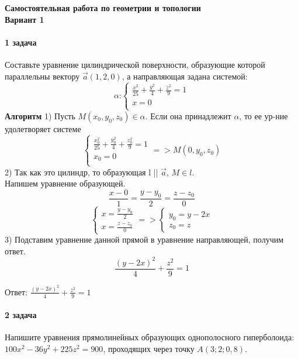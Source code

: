 \documentclass[a4paper,14pt]{extreport} %
\begin{document}
  
\begin{center}
    \textbf{Самостоятельная работа по геометрии и топологии} \\
    \textbf{Вариант 1}
\end{center}

\noindent


\paragraph {1 задача}
 Составьте уравнение цилиндрической поверхности, образующие которой параллельны вектору $\vec{a} (1,2,0)$, а направляющая задана системой:
\[
  \alpha \text{:}
\begin{cases}
    \frac{x^2}{25} + \frac{y^2}{4}+ \frac{z^2}{9}= 1 \\
    x = 0\\
\end{cases}
\]
\textbf{Алгоритм}
1) Пусть $M(x_0, y_0, z_0) \in \alpha$.  Если она принадлежит $\alpha$, 
то ее ур-ние удолетворяет системе
\[  
\begin{cases}
    \frac{x_0^2}{25} + \frac{y_0^2}{4}+ \frac{z_0^2}{9}= 1 \\
    x_0 = 0\\
\end{cases}
=> M(0, y_0, z_0)
\]
2) Так как это цилиндр, то образующая l || $\vec{a}$, $M \in l$. \\ 
Напишем уравнение образующей. 
\[
  \frac{x-0}{1} = \frac{y-y_0}{2} = \frac{z-z_0}{0}
\]
\[
  \begin{cases}
     x = \frac{y-y_0}{2}\\ 
     x = \frac{z-z_0}{0}
  \end{cases} => 
  \begin{cases}
    y_0 = y - 2x \\ 
    z_0 = z
  \end{cases} 
\]
3) Подставим уравнение данной прямой в уравнение направляющей, получим ответ. 
\[
  \frac{(y-2x)^2}{4} + \frac{z^2}{9} = 1
\]

Ответ: $\frac{(y-2x)^2}{4} + \frac{z^2}{9} = 1$

\noindent
\paragraph {2 задача}
Напишите уравнения прямолинейных образующих однополосного гиперболоида: $100x^2 - 36y^2 + 225z^2 = 900$, проходящих через точку $A(3; 2; 0,8)$.
\end{document}
